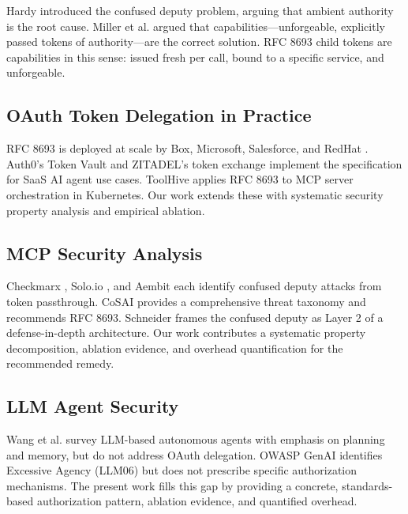 \documentclass[journal]{IEEEtran}
\theoremstyle{definition}
\begin{document}
Hardy \cite{hardy1988} introduced the confused deputy problem, arguing that
ambient authority is the root cause. Miller et al. \cite{miller2003} argued that
capabilities---unforgeable, explicitly passed tokens of authority---are the
correct solution. RFC 8693 child tokens are capabilities in this sense: issued
fresh per call, bound to a specific service, and unforgeable.

\subsection{OAuth Token Delegation in Practice}

RFC 8693 \cite{rfc8693} is deployed at scale by Box, Microsoft, Salesforce, and
RedHat \cite{rfc8693_deploy}. Auth0's Token Vault \cite{auth0_token_vault} and
ZITADEL's token exchange \cite{zitadel_te} implement the specification for SaaS
AI agent use cases. ToolHive \cite{toolhive} applies RFC 8693 to MCP server
orchestration in Kubernetes. Our work extends these with systematic security property analysis
and empirical ablation.

\subsection{MCP Security Analysis}

Checkmarx \cite{checkmarx_mcp}, Solo.io \cite{solo_mcp}, and Aembit
\cite{aembit_mcp} each identify confused deputy attacks from token passthrough.
CoSAI \cite{cosai_mcp} provides a comprehensive threat taxonomy and recommends
RFC 8693. Schneider \cite{schneider_mcp} frames the confused deputy as Layer 2
of a defense-in-depth architecture. Our work contributes a systematic property decomposition, ablation evidence, and
overhead quantification for the recommended remedy.

\subsection{LLM Agent Security}

Wang et al. \cite{wang2024survey} survey LLM-based autonomous agents with
emphasis on planning and memory, but do not address OAuth delegation. OWASP GenAI
\cite{owasp_genai} identifies Excessive Agency (LLM06) but does not prescribe
specific authorization mechanisms. The present work fills this gap by providing
a concrete, standards-based authorization pattern, ablation evidence, and
quantified overhead.


\end{document}

